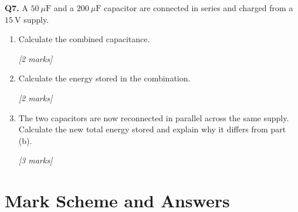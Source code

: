 \begin{tcolorbox}[colback=white, colframe=midblue, breakable]
\begin{minipage}{\linewidth}
\textbf{Q7.} A $50\ \mu\text{F}$ and a $200\ \mu\text{F}$ capacitor are connected in series and charged from a $15\ \text{V}$ supply.

\begin{enumerate}[label=(\alph*)]
  \item Calculate the combined capacitance.
  \par\hfill\textit{[2 marks]}
  \vspace{3cm}

  \item Calculate the energy stored in the combination.
  \par\hfill\textit{[2 marks]}
  \vspace{3cm}

  \item The two capacitors are now reconnected in parallel across the same supply. Calculate the new total energy stored and explain why it differs from part (b).
  \par\hfill\textit{[3 marks]}
  \vspace{4cm}
\end{enumerate}
\end{minipage}

\end{tcolorbox}

\section{Mark Scheme and Answers}

